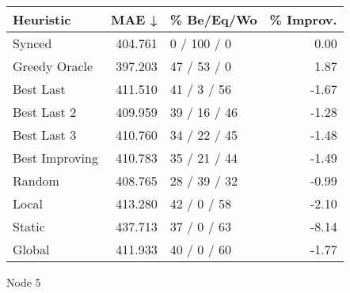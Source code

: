 \begin{tabular}{lrlr}
\toprule
\textbf{Heuristic} & \textbf{MAE ↓} & \textbf{\% Be/Eq/Wo} & \textbf{\% Improv.} \\
\midrule
            Synced &        404.761 &          0 / 100 / 0 &                0.00 \\
     Greedy Oracle &        397.203 &          47 / 53 / 0 &                1.87 \\
         Best Last &        411.510 &          41 / 3 / 56 &               -1.67 \\
       Best Last 2 &        409.959 &         39 / 16 / 46 &               -1.28 \\
       Best Last 3 &        410.760 &         34 / 22 / 45 &               -1.48 \\
    Best Improving &        410.783 &         35 / 21 / 44 &               -1.49 \\
            Random &        408.765 &         28 / 39 / 32 &               -0.99 \\
             Local &        413.280 &          42 / 0 / 58 &               -2.10 \\
            Static &        437.713 &          37 / 0 / 63 &               -8.14 \\
            Global &        411.933 &          40 / 0 / 60 &               -1.77 \\
\bottomrule
\end{tabular}
\caption{Node 5}
\label{tab:non_lr05_le2_bs2_5}
